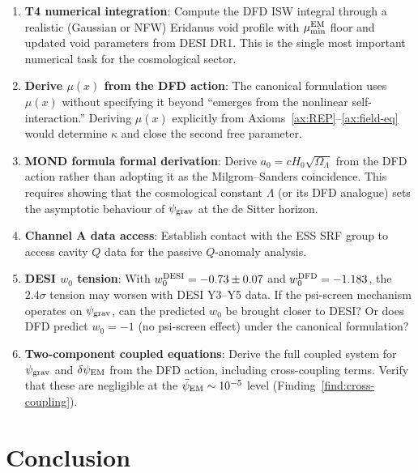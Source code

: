\documentclass[11pt]{article}
\newcommand{\psigrav}{\psi_{\rm grav}}
\newcommand{\dpsiEM}{\delta\psi_{\rm EM}}
\newcommand{\psiEM}{\bar{\psi}_{\rm EM}}
\newcommand{\aM}{a_0}
\newcommand{\Hzero}{H_0}
\newcommand{\mufd}{\mu}
\newcommand{\mumin}{\mu_{\rm min}}
\begin{document}
\begin{enumerate}
\item \textbf{T4 numerical integration}: Compute the DFD ISW integral
  through a realistic (Gaussian or NFW) Eridanus void profile with
  $\mumin^{\rm EM}$ floor and updated void parameters from DESI DR1.
  This is the single most important numerical task for the cosmological
  sector.

\item \textbf{Derive $\mufd(x)$ from the DFD action}: The canonical
  formulation uses $\mufd(x)$ without specifying it beyond ``emerges
  from the nonlinear self-interaction.'' Deriving $\mufd(x)$ explicitly
  from Axioms~\ref{ax:REP}--\ref{ax:field-eq} would determine $\kappa$
  and close the second free parameter.

\item \textbf{MOND formula formal derivation}: Derive $\aM =
  c\Hzero\sqrt{\Omega_\Lambda}$ from the DFD action rather than
  adopting it as the Milgrom--Sanders coincidence. This requires showing
  that the cosmological constant $\Lambda$ (or its DFD analogue) sets
  the asymptotic behaviour of $\psigrav$ at the de Sitter horizon.

\item \textbf{Channel A data access}: Establish contact with the ESS
  SRF group to access cavity $Q$ data for the passive $Q$-anomaly
  analysis.

\item \textbf{DESI $w_0$ tension}: With $w_0^{\rm DESI} = -0.73 \pm 0.07$
  and $w_0^{\rm DFD} = -1.183$, the $2.4\sigma$ tension may worsen with
  DESI Y3--Y5 data. If the psi-screen mechanism operates on $\psigrav$,
  can the predicted $w_0$ be brought closer to DESI? Or does DFD predict
  $w_0 = -1$ (no psi-screen effect) under the canonical formulation?

\item \textbf{Two-component coupled equations}: Derive the full coupled
  system for $\psigrav$ and $\dpsiEM$ from the DFD action, including
  cross-coupling terms. Verify that these are negligible at the
  $\psiEM \sim 10^{-5}$ level (Finding~\ref{find:cross-coupling}).
\end{enumerate}

\section{Conclusion}
\label{sec:conclusion}
\end{document}
